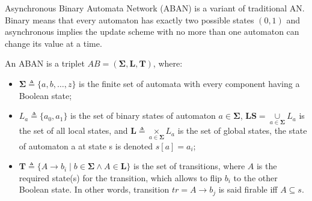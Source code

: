 \documentclass[runningheads]{llncs}
\newcommand{\acm}[3]{#1\rightarrow#2}
\begin{document}
%

Asynchronous Binary Automata Network (ABAN) is a variant of traditional AN.
Binary means that every automaton has exactly two possible states $(0,1)$ and asynchronous implies the update scheme with no more than one automaton can change its value at a time. 

\begin{definition}[ABAN]
An ABAN is a triplet $AB = (\mathbf{\Sigma},\mathbf{L},\mathbf{T})$, where:
\begin{itemize}
\item $\mathbf{\Sigma}\triangleq\{a,b,\ldots,z\}$ is the finite set of automata with every component having a Boolean state;
\item $L_a\triangleq\{a_0,a_1\}$ is the set of binary states of automaton $a\in \mathbf{\Sigma}$, $\mathbf{LS}=\underset{a\in \mathbf{\Sigma}}{\cup} L_a$ is the set of all local states, and $\mathbf{L}\triangleq \underset{a\in \mathbf{\Sigma}}{\times} L_a$ is the set of global states, the state of automaton a at state s is denoted $s[a]=a_i$;
\item $\mathbf{T}\triangleq \{A\rightarrow b_i\mid b\in \mathbf{\Sigma} \land A\in \mathbf{L}\}$ is the set of transitions, where $A$ is the required state(s) for the transition, which allows to flip $b_i$ to the other Boolean state. In other words, transition $tr=\acm{A}{b_j}{b_k}$ is said firable iff $A\subseteq s$.%
\end{itemize}
\end{definition}
\end{document}
